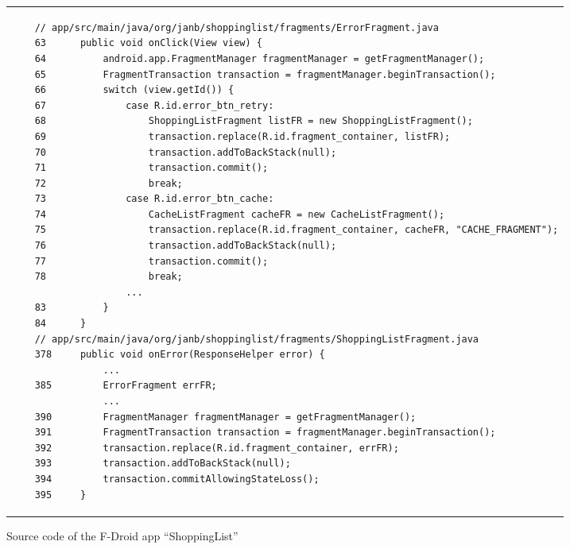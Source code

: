 \begin{figure}[htbp]
    \centering
    \begin{tabular*}{\linewidth}{l}
    \begin{lstlisting}
    // app/src/main/java/org/janb/shoppinglist/fragments/ErrorFragment.java 
    63      public void onClick(View view) {
    64          android.app.FragmentManager fragmentManager = getFragmentManager();
    65          FragmentTransaction transaction = fragmentManager.beginTransaction();
    66          switch (view.getId()) {
    67              case R.id.error_btn_retry:
    68                  ShoppingListFragment listFR = new ShoppingListFragment();
    69                  transaction.replace(R.id.fragment_container, listFR);
    70                  transaction.addToBackStack(null);
    71                  transaction.commit();
    72                  break;
    73              case R.id.error_btn_cache:
    74                  CacheListFragment cacheFR = new CacheListFragment();
    75                  transaction.replace(R.id.fragment_container, cacheFR, "CACHE_FRAGMENT");
    76                  transaction.addToBackStack(null);
    77                  transaction.commit();
    78                  break;
                    ...
    83          }
    84      }
    // app/src/main/java/org/janb/shoppinglist/fragments/ShoppingListFragment.java 
    378     public void onError(ResponseHelper error) {
                ...
    385         ErrorFragment errFR;
                ...
    390         FragmentManager fragmentManager = getFragmentManager();
    391         FragmentTransaction transaction = fragmentManager.beginTransaction();
    392         transaction.replace(R.id.fragment_container, errFR);
    393         transaction.addToBackStack(null);
    394         transaction.commitAllowingStateLoss();
    395     }

    \end{lstlisting}
    \end{tabular*}
    \caption{Source code of the F-Droid app ``ShoppingList''}
    \label{code-shoplist}
    \end{figure}


